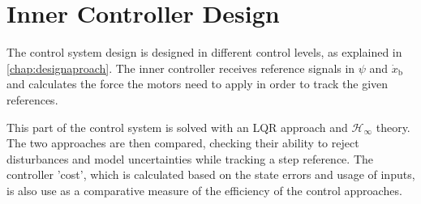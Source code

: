 \chapter{Inner Controller Design}\label{chap:innercontrol}

The control system design is designed in different control levels, as explained in \autoref{chap:designaproach}. The inner controller receives reference signals in $\psi$ and $\dot{x}_\mathrm{b}$ and calculates the force the motors need to apply in order to track the given references. 

This part of the control system is solved with an LQR approach and $\mathcal{H}_\infty$ theory. The two approaches are then compared, checking their ability to reject disturbances and model uncertainties while tracking a step reference. The controller 'cost', which is calculated based on the state errors and usage of inputs, is also use as a comparative measure of the efficiency of the control approaches.



